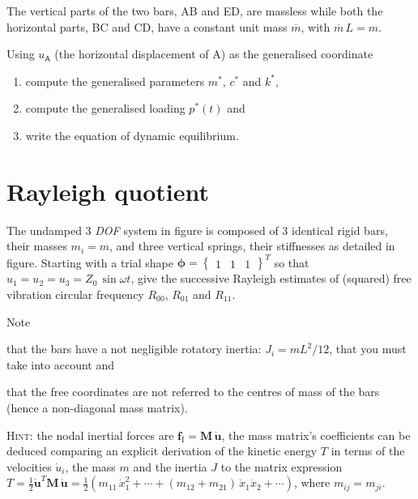 \documentclass[11pt,a4paper]{article}
\newenvironment{enumin}%
   {\begin{inparaenum}[\hspace{0.6em}(1)]}%
   {\end{inparaenum}}
\begin{document}
The vertical parts of the two bars, \textsf{AB} and \textsf{ED}, are
massless while both the horizontal parts, \textsf{BC} and \textsf{CD},
have a constant unit mass $\overline m$, with $\overline m\,L=m$.

\medskip\noindent Using $u_\textsf{A}$ (the horizontal displacement of
\textsf{A}) as the generalised coordinate
\begin{enumerate}
\item compute the generalised parameters $m^*$,  $c^*$ and $k^*$,
\item compute the generalised loading $p^*(t)$ and
\item write the equation of dynamic equilibrium.
\end{enumerate}
\section{Rayleigh quotient}
\label{sec:rayleigh}
\[\]
\noindent The undamped 3 \emph{DOF} system in figure is composed of 3
identical rigid bars, their masses $m_i=m$, and three vertical
springs, their stiffnesses as detailed in figure.  Starting with a
trial shape $\bm{\phi}= \begin{Bmatrix} 1 & 1 & 1
\end{Bmatrix}^T$ so that $u_1=u_2=u_3=Z_0\,\sin\omega t$, give the successive
Rayleigh estimates of (squared) free vibration circular frequency
$R_{00}$, $R_{01}$ and $R_{11}$. 

Note
\begin{enumin}
\item that the bars have a not negligible rotatory inertia:
  $J_i=mL^2/12$, that you must take into account and
\item that the free coordinates are not referred to the centres of
  mass of the bars (hence a non-diagonal mass matrix).
\end{enumin}

\smallskip\noindent\textsc{Hint:} {\small
  the nodal inertial forces are $\bm f_\text{I}=\bm M\,\ddot{\bm u}$,
  the mass matrix's coefficients can be deduced comparing an explicit
  derivation of the kinetic energy $T$ in terms of the velocities
  $\dot u_i$, the mass $m$ and the inertia $J$ to the matrix
  expression $T=\frac12 \dot{\bm u}^T \bm M\,\dot{\bm u} = \frac12
  \left( m_{11}\, \dot x_1^2 +\cdots+(m_{12}+m_{21})\,\dot x_1 \dot x_2 +
    \cdots \right)$, where $m_{ij}=m_{ji}$.}
\end{document}
